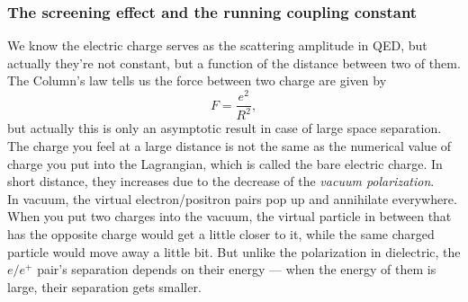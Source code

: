 \documentclass{article}
\newcommand{\be}{\begin{equation}}
\newcommand{\ee}{\end{equation}}
\renewcommand{\1}{\left}
\renewcommand{\2}{\right}
\begin{document}
\subsubsection{The screening effect and the running coupling constant}
We know the electric charge serves as the scattering amplitude in QED, but actually they're not constant, but a function of the distance between two of them.\\
The Column's law tells us the force between two charge are given by
\be
F=\frac{e^2}{R^2},
\ee
but actually this is only an asymptotic result in case of large space separation. The charge you feel at a large distance is not the  same as the numerical value of charge you put into the Lagrangian, which is called the bare electric charge. In short distance, they increases due to the decrease of the \textit{vacuum polarization}. \\
In vacuum, the virtual electron/positron pairs pop up and annihilate everywhere. When you put two charges into the vacuum, the virtual particle in between that has the opposite charge would get a little closer to it, while the same charged particle would move away a little bit. But unlike the polarization in dielectric, the $e/e^+$ pair's separation depends on their energy --- when the energy of them is large, their separation gets smaller.
\end{document}
